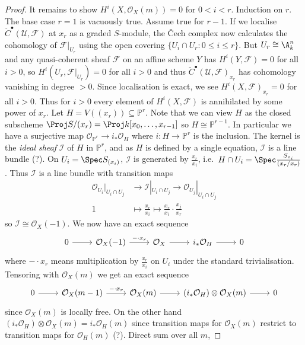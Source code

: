 \documentclass[a4paper]{article}
\renewcommand*{\P}{\mathbb{P}}
\newcommand{\sh}[1]{\mathcal{#1}} %
\begin{document}
\begin{proof}
  It remains to show \(H^i(X, \sh O_X(m)) = 0\) for \(0 < i < r\). Induction on \(r\). The base case \(r = 1\) is vacuously true. Assume true for \(r - 1\). If we localise \(\check C^\bullet(\mathcal U, \sh F)\) at \(x_r\) as a graded \(S\)-module, the Čech complex now calculates the cohomology of \(\sh F|_{U_r}\) using the open covering \(\{U_i \cap U_r: 0 \leq i \leq r\}\). But \(U_r \cong \A^n_k\) and any quasi-coherent sheaf \(\sh F\) on an affine scheme \(Y\) has \(H^i(Y, \sh F) = 0\) for all \(i > 0\), so \(H^i(U_r, \sh F|_{U_r}) = 0\) for all \(i > 0\) and thus \(\check C^\bullet(\mathcal U, \sh F)_{x_r}\) has cohomology vanishing in degree \(> 0\). Since localisation is exact, we see \(H^i(X, \sh F)_{x_r} = 0\) for all \(i > 0\). Thus for \(i > 0\) every element of \(H^i(X, \sh F)\) is annihilated by some power of \(x_r\). Let \(H = V((x_r)) \subseteq \P^r\). Note that we can view \(H\) as the closed subscheme \(\Proj S/(x_r) = \Proj k[x_0, \dots, x_{r - 1}]\) so \(H \cong \P^{r - 1}\). In particular we have a surjective map \(\sh O_{\P^r} \to i_* \sh O_H\) where \(i: H \to \P^r\) is the inclusion. The kernel is the \emph{ideal sheaf} \(\sh I\) of \(H\) in \(\P^r\), and as \(H\) is defined by a single equation, \(\sh I\) is a line bundle (?). On \(U_i = \Spec S_{(x_i)}\), \(\sh I\) is generated by \(\frac{x_r}{x_i}\), i.e.\ \(H \cap U_i = \Spec \frac{S_{x_i}}{(x_r/x_r)}\). Thus \(\sh I\) is a line bundle with transition maps
  \begin{align*}
    \sh O_{U_i}|_{U_i \cap U_j} &\to \sh I|_{U_i \cap U_j} \to \sh O_{U_j}|_{U_i \cap U_j} \\
    1 &\mapsto \frac{x_r}{x_i} \mapsto \frac{x_r}{x_i} \cdot \frac{x_j}{x_r}
  \end{align*}
  so \(\sh I \cong \sh O_X(-1)\). We now have an exact sequence
  \[
    \begin{tikzcd}
      0 \ar[r] & \sh O_X(-1) \ar[r, "- \cdot x_r"] & \sh O_X \ar[r] & i_* \sh O_H \ar[r] & 0
    \end{tikzcd}
  \]
  where \(- \cdot x_r\) means multiplication by \(\frac{x_r}{x_i}\) on \(U_i\) under the standard trivialisation. Tensoring with \(\sh O_X(m)\) we get an exact sequence
  \[
    \begin{tikzcd}
      0 \ar[r] & \sh O_X(m - 1) \ar[r, "- \cdot x_r"] & \sh O_X(m) \ar[r] & (i_* \sh O_H) \otimes \sh O_X(m) \ar[r] & 0
    \end{tikzcd}
  \]
  since \(\sh O_X(m)\) is locally free. On the other hand \((i_* \sh O_H) \otimes \sh O_X(m) = i_* \sh O_H(m)\) since transition maps for \(\sh O_X(m)\) restrict to transition maps for \(\sh O_H(m)\) (?). Direct sum over all \(m\),

\end{proof}
\end{document}
